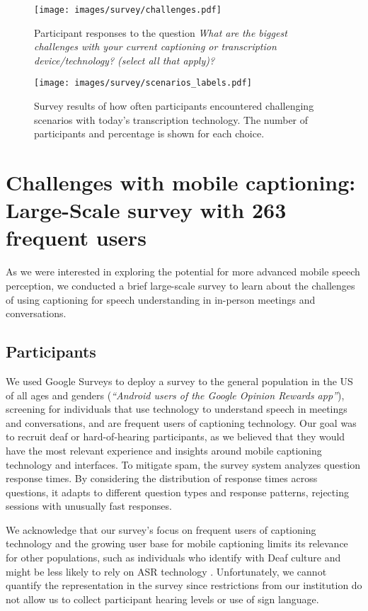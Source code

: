 \begin{figure*}
\centerline{\texttt{[image: images/survey/challenges.pdf]}}
\caption{Participant responses to the question \emph{What are the biggest challenges with your current captioning or transcription device/technology? (select all that apply)?}}
\label{fig: survey-challenges}
\end{figure*}

\begin{figure*}
\centerline{\texttt{[image: images/survey/scenarios\_labels.pdf]}}
\caption{Survey results of how often participants encountered challenging scenarios with today's transcription technology. The number of participants and percentage is shown for each choice.}
\label{fig: survey-scenarios}
\end{figure*}

\section{Challenges with mobile captioning: Large-Scale survey with 263 frequent users} \label{surveys_foundational}
As we were interested in exploring the potential for more advanced mobile speech perception, we conducted a brief large-scale survey to learn about the challenges of using captioning for speech understanding in in-person meetings and conversations. %

\subsection{Participants}
We used Google Surveys \cite{GoogleSurveys} to deploy a survey to the general population in the US of all ages and genders (\emph{“Android users of the Google Opinion Rewards app”}), screening for individuals that use technology to understand speech in meetings and conversations, and are frequent users of captioning technology. Our goal was to recruit deaf or hard-of-hearing participants, as we believed that they would have the most relevant experience and insights around mobile captioning technology and interfaces. To mitigate spam, the survey system analyzes question response times. By considering the distribution of response times across questions, it adapts to different question types and response patterns, rejecting sessions with unusually fast responses.

We acknowledge that our survey's focus on frequent users of captioning technology and the growing user base for mobile captioning limits its relevance for other populations, such as individuals who identify with Deaf culture and might be less likely to rely on ASR technology \cite{deaf_community_questionnaires}. Unfortunately, we cannot quantify the representation in the survey since restrictions from our institution do not allow us to collect participant hearing levels or use of sign language. 

